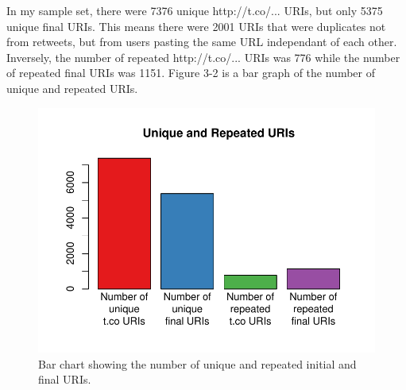 \documentclass[a4paper,12pt]{article}
\begin{document}
In my sample set, there were 7376 unique http://t.co/... URIs,
but only 5375 unique final URIs. This means there were 2001 URIs that were duplicates not from
retweets, but from users pasting the same URL independant of each other.  
Inversely, the number of repeated http://t.co/... URIs was 776 while the number of repeated final
URIs was 1151. Figure 3-2 is a bar graph of the number of unique and repeated URIs. 
\begin{figure}[H]
    \centering
    \includegraphics{stats/unique_and_dupe.pdf}
    \caption{Bar chart showing the number of unique and repeated initial and final URIs.}
\end{figure}
\end{document}
